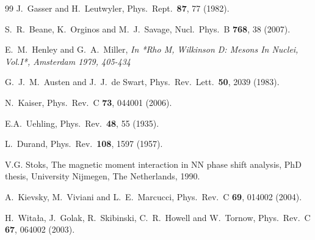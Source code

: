 \documentclass[aps,rmp,nofootinbib,twocolumn,floatfix]{revtex4}
\begin{document}
\begin{thebibliography}{99}
  J.~Gasser and H.~Leutwyler,
  Phys.\ Rept.\  {\bf 87}, 77 (1982).

  S.~R.~Beane, K.~Orginos and M.~J.~Savage,
  Nucl.\ Phys.\  B {\bf 768}, 38 (2007).


  E.~M.~Henley and G.~A.~Miller,
{\it  In *Rho M, Wilkinson D: Mesons In Nuclei, Vol.I*, Amsterdam 1979, 405-434}

  G.~J.~M.~Austen and J.~J.~de Swart,
  Phys.\ Rev.\ Lett.\  {\bf 50}, 2039 (1983).

  N.~Kaiser,
  Phys.\ Rev.\  C {\bf 73}, 044001 (2006).

  E.A.~Uehling,
  Phys.\ Rev.\  {\bf 48}, 55 (1935).


  L.~Durand,
  Phys.\ Rev.\  {\bf 108}, 1597 (1957).

V.G. Stoks,
  The magnetic moment interaction in NN phase shift analysis,
  PhD thesis, University Nijmegen, The Netherlands, 1990.

  A.~Kievsky, M.~Viviani and L.~E.~Marcucci,
  Phys.\ Rev.\  C {\bf 69}, 014002 (2004).

  H.~Wita{\l}a, J.~Golak, R.~Skibinski, C.~R.~Howell and W.~Tornow,
  Phys.\ Rev.\  C {\bf 67}, 064002 (2003).


\end{thebibliography}
\end{document}
